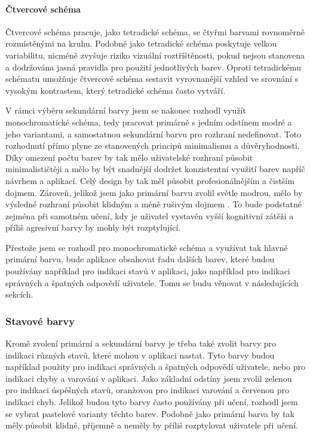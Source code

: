 \paragraph{Čtvercové schéma} Čtvercové schéma pracuje, jako tetradické schéma, se čtyřmi barvami rovnoměrně rozmístěnými na kruhu. Podobně jako tetradické schéma poskytuje velkou variabilitu, nicméně zvyšuje riziko vizuální roztříštěnosti, pokud nejsou stanovena a dodržována jasná pravidla pro použití jednotlivých barev. Oproti tetradickému schématu umožňuje čtvercové schéma sestavit vyrovnanější vzhled ve srovnání s vysokým kontrastem, který tetradické schéma často vytváří. \cite{FigmaColorWheel} 

V rámci výběru sekundární barvy jsem se nakonec rozhodl využít monochromatické schéma, tedy pracovat primárně s jedním odstínem modré a jeho variantami, a samostatnou sekundární barvu pro rozhraní nedefinovat. Toto rozhodnutí přímo plyne ze stanovených principů minimalismu a důvěryhodnosti. Díky omezení počtu barev by tak mělo uživatelské rozhraní působit minimalističtěji a mělo by být snadnější dodržet konzistentní využití barev napříč návrhem a aplikací. Celý design by tak měl působit profesionálnějším a čistším dojmem. Zároveň, jelikož jsem jako primární barvu zvolil světle modrou, mělo by výsledné rozhraní působit klidným a méně rušivým dojmem \cite{FigmaLightBlue}. To bude podstatné zejména při samotném učení, kdy je uživatel vystavěn vyšší kognitivní zátěži a příliš agresivní barvy by mohly být rozptylující.

Přestože jsem se rozhodl pro monochromatické schéma a využívat tak hlavně primární barvu, bude aplikace obsahovat řadu dalších barev, které budou používány například pro indikaci stavů v aplikaci, jako například pro indikaci správných a špatných odpovědí uživatele. Tomu se budu věnovat v následujících sekcích.

\subsubsection{Stavové barvy}

Kromě zvolení primární a sekundární barvy je třeba také zvolit barvy pro indikaci různých stavů, které mohou v aplikaci nastat. Tyto barvy budou například použity pro indikaci správných a špatných odpovědí uživatele, nebo pro indikaci chyby a varování v aplikaci. Jako základní odstíny jsem zvolil zelenou pro indikaci úspěšných stavů, oranžovou pro indikaci varování a červenou pro indikaci chyb. Jelikož budou tyto barvy často používány při učení, rozhodl jsem se vybrat pastelové varianty těchto barev. Podobně jako primární barva by tak měly působit klidně, příjemně a neměly by příliš rozptylovat uživatele při učení.

